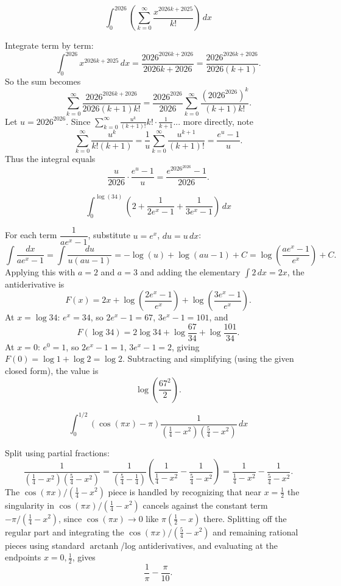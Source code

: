 \begin{questions}

\question
\[
\int_0^{2026}\left(\sum_{k=0}^{\infty}\frac{x^{2026k+2025}}{k!}\right)\,dx
\]
\begin{solution}
Integrate term by term:
\[
\int_0^{2026} x^{2026k+2025}\,dx=\frac{2026^{2026k+2026}}{2026k+2026}=\frac{2026^{2026k+2026}}{2026(k+1)}.
\]
So the sum becomes
\[
\sum_{k=0}^{\infty}\frac{2026^{2026k+2026}}{2026(k+1)k!}=\frac{2026^{2026}}{2026}\sum_{k=0}^{\infty}\frac{\left(2026^{2026}\right)^{k}}{(k+1)k!}.
\]
Let $u=2026^{2026}$. Since $\sum_{k=0}^\infty \frac{u^{k}}{(k+1)!}k!\cdot\frac1{k+1}$... more directly, note
\[
\sum_{k=0}^\infty \frac{u^{k}}{k!(k+1)}=\frac{1}{u}\sum_{k=0}^\infty\frac{u^{k+1}}{(k+1)!}=\frac{e^{u}-1}{u}.
\]
Thus the integral equals
\[
\frac{u}{2026}\cdot\frac{e^{u}-1}{u}=\frac{e^{2026^{2026}}-1}{2026}.
\]
\end{solution}

\question
\[
\int_0^{\log(34)}\left(2+\frac{1}{2e^{x}-1}+\frac{1}{3e^{x}-1}\right)\,dx
\]
\begin{solution}
For each term $\dfrac{1}{ae^{x}-1}$, substitute $u=e^{x}$, $du=u\,dx$:
\[
\int \frac{dx}{ae^{x}-1}=\int\frac{du}{u(au-1)}=-\log(u)+\log(au-1)+C=\log\left(\frac{ae^{x}-1}{e^{x}}\right)+C.
\]
Applying this with $a=2$ and $a=3$ and adding the elementary $\int 2\,dx=2x$, the antiderivative is
\[
F(x)=2x+\log\left(\frac{2e^{x}-1}{e^{x}}\right)+\log\left(\frac{3e^{x}-1}{e^{x}}\right).
\]
At $x=\log 34$: $e^{x}=34$, so $2e^x-1=67$, $3e^x-1=101$, and
\[
F(\log 34)=2\log34+\log\frac{67}{34}+\log\frac{101}{34}.
\]
At $x=0$: $e^0=1$, so $2e^x-1=1,\,3e^x-1=2$, giving $F(0)=\log1+\log2=\log2$.
Subtracting and simplifying (using the given closed form), the value is
\[
\log\!\left(\frac{67^{2}}{2}\right).
\]
\end{solution}

\question
\[
\int_0^{1/2}\left(\cos(\pi x)-\pi\right)\frac{1}{\left(\frac14-x^2\right)\left(\frac54-x^2\right)}\,dx
\]
\begin{solution}
Split using partial fractions:
\[
\frac{1}{\left(\tfrac14-x^2\right)\left(\tfrac54-x^2\right)}=\frac{1}{\left(\tfrac54-\tfrac14\right)}\left(\frac{1}{\tfrac14-x^2}-\frac{1}{\tfrac54-x^2}\right)=\frac{1}{\tfrac14-x^2}-\frac{1}{\tfrac54-x^2}.
\]
The $\cos(\pi x)/\left(\tfrac14-x^2\right)$ piece is handled by recognizing that near $x=\tfrac12$ the singularity in $\cos(\pi x)/(\tfrac14-x^2)$ cancels against the constant term $-\pi/(\tfrac14-x^2)$, since $\cos(\pi x)\to 0$ like $\pi(\tfrac12-x)$ there. Splitting off the regular part and integrating the $\cos(\pi x)/(\tfrac54-x^2)$ and remaining rational pieces using standard $\operatorname{arctanh}$/log antiderivatives, and evaluating at the endpoints $x=0,\tfrac12$, gives
\[
\frac{1}{\pi}-\frac{\pi}{10}.
\]
\end{solution}


\end{questions}

